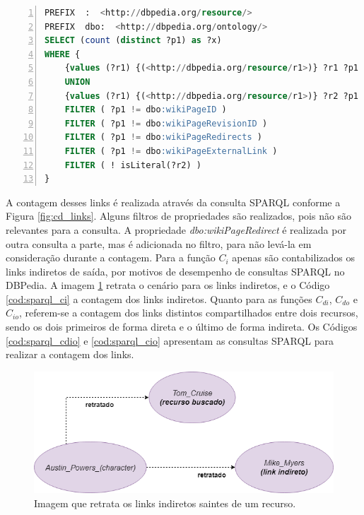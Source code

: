 \begin{lstlisting}[caption=Consulta SPARQL para contagem de links diretos, language=SQL, frame=single, label={cod:sparql_cd}, float, numbers=left]
PREFIX  :  <http://dbpedia.org/resource/>
PREFIX  dbo:  <http://dbpedia.org/ontology/>
SELECT (count (distinct ?p1) as ?x)
WHERE {
	{values (?r1) {(<http://dbpedia.org/resource/r1>)} ?r1 ?p1 ?r2 . FILTER (?r1 != ?r2)}
	UNION
	{values (?r1) {(<http://dbpedia.org/resource/r1>)} ?r2 ?p1 ?r1 . FILTER (?r1 != ?r2)}
	FILTER ( ?p1 != dbo:wikiPageID )
	FILTER ( ?p1 != dbo:wikiPageRevisionID )
	FILTER ( ?p1 != dbo:wikiPageRedirects )
	FILTER ( ?p1 != dbo:wikiPageExternalLink )
	FILTER ( ! isLiteral(?r2) )
}
\end{lstlisting}

A contagem desses links é realizada através da consulta \ac{SPARQL} conforme a Figura \ref{fig:cd_links}. Alguns filtros de propriedades são realizados, pois não são relevantes para a consulta. A propriedade \textit{dbo:wikiPageRedirect} é realizada por outra consulta a parte, mas é adicionada no filtro, para não levá-la em consideração durante a contagem. Para a função $C_i$ apenas são contabilizados os links indiretos de saída, por motivos de desempenho de consultas SPARQL no DBPedia. A imagem \ref{fig:ci_links} retrata o cenário para os links indiretos, e o Código \ref{cod:sparql_ci} a contagem dos links indiretos. Quanto para as funções $C_{di}$, $C_{do}$ e $C_{io}$, referem-se a contagem dos links distintos compartilhados entre dois recursos, sendo os dois primeiros de forma direta e o último de forma indireta. Os Códigos \ref{cod:sparql_cdio} e \ref{cod:sparql_cio} apresentam as consultas \ac{SPARQL} para realizar a contagem dos links.

\begin{figure}
	\centering
	\includegraphics[scale=0.5]{imagens/ci_links.png}
	\caption{Imagem que retrata os links indiretos saintes de um recurso.}
	\label{fig:ci_links}
\end{figure}

